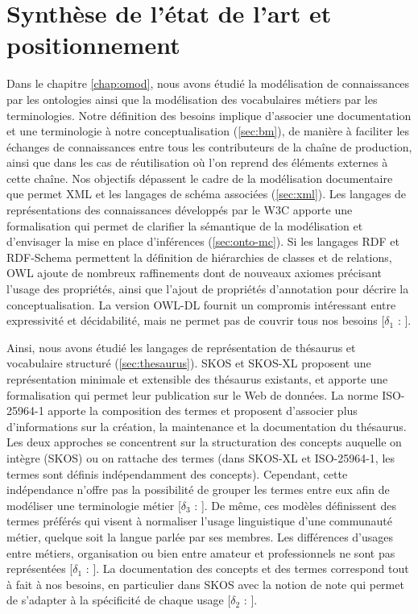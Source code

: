 \section{Synthèse de l'état de l'art et positionnement}\label{sec:synthese}
Dans le chapitre \ref{chap:omod}, nous avons étudié la modélisation de connaissances par les ontologies ainsi que la modélisation des vocabulaires métiers par les terminologies. 
Notre définition des besoins implique d'associer une documentation et une terminologie à notre conceptualisation (\ref{sec:bm}), de manière à faciliter les échanges de connaissances entre tous les contributeurs de la chaîne de production, ainsi que dans les cas de réutilisation où l'on reprend des éléments externes à cette chaîne.
Nos objectifs dépassent le cadre de la modélisation documentaire que permet XML et les langages de schéma associées (\ref{sec:xml}).
Les langages de représentations des connaissances développés par le W3C apporte une formalisation qui permet de clarifier la sémantique de la modélisation et d'envisager la mise en place d'inférences (\ref{sec:onto-mc}).
Si les langages RDF et RDF-Schema permettent la définition de hiérarchies de classes et de relations, OWL ajoute de nombreux raffinements dont de nouveaux axiomes précisant l'usage des propriétés, ainsi que l'ajout de propriétés d'annotation pour décrire la conceptualisation.
La version OWL-DL fournit un compromis intéressant entre expressivité et décidabilité, mais ne permet pas de couvrir tous nos besoins [$\delta_1$ : ].

Ainsi, nous avons étudié les langages de représentation de thésaurus et vocabulaire structuré (\ref{sec:thesaurus}).
SKOS et SKOS-XL proposent une représentation minimale et extensible des thésaurus existants, et apporte une formalisation qui permet leur publication sur le Web de données.
La norme ISO-25964-1 apporte la composition des termes et proposent d'associer plus d'informations sur la création, la maintenance et la documentation du thésaurus.
Les deux approches se concentrent sur la structuration des concepts auquelle on intègre (SKOS) ou on rattache des termes (dans SKOS-XL et ISO-25964-1, les termes sont définis indépendamment des concepts). 
Cependant, cette indépendance n'offre pas la possibilité de grouper les termes entre eux afin de modéliser une terminologie métier [$\delta_3$ : ]. 
De même, ces modèles définissent des termes préférés qui visent à normaliser l'usage linguistique d'une communauté métier, quelque soit la langue parlée par ses membres.
Les différences d'usages entre métiers, organisation ou bien entre amateur et professionnels ne sont pas représentées [$\delta_1$ : ]. 
La documentation des concepts et des termes correspond tout à fait à nos besoins, en particulier dans SKOS avec la notion de note qui permet de s'adapter à la spécificité de chaque usage [$\delta_2$ : ].\\



